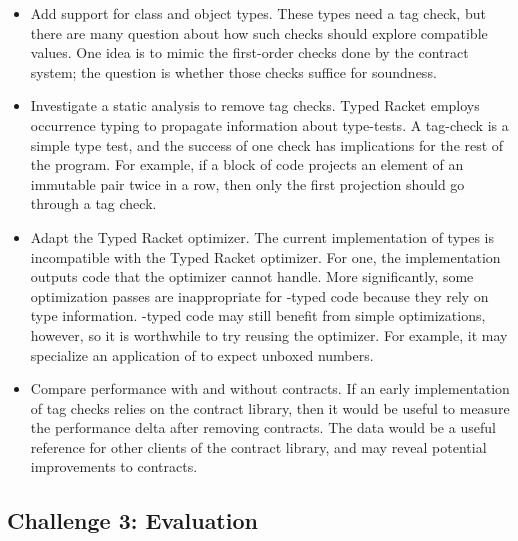 \begin{itemize}
  \item
    Add support for class and object types.
    These types need a tag check, but there are many question about how such
     checks should explore compatible values.
    One idea is to mimic the first-order checks done by the contract system;
     the question is whether those checks suffice for soundness.
  \item
    Investigate a static analysis to remove tag checks.
    Typed Racket employs occurrence typing to propagate information about type-tests.
    A tag-check is a simple type test, and the success of one check has implications
     for the rest of the program.
    For example, if a block of code projects an element of an immutable pair twice in a row,
     then only the first projection should go through a tag check.
  \item
    Adapt the Typed Racket optimizer.
    The current implementation of \tshallow{} types is incompatible with the Typed
     Racket optimizer.
    For one, the implementation outputs code that the optimizer cannot handle.
    More significantly, some optimization passes are inappropriate for \tshallow{}-typed
     code because they rely on \tdeep{} type information.
    \tShallow{}-typed code may still benefit from simple optimizations, however,
     so it is worthwhile to try reusing the optimizer.
    For example, it may specialize an application of \racketcode{+} to expect unboxed numbers.
  \item
   Compare performance with and without contracts.
   If an early implementation of \tshallow{} tag checks relies on the contract library,
   then it would be useful to measure the performance delta after removing contracts.
   The data would be a useful reference for other clients of the contract library,
   and may reveal potential improvements to contracts.
\end{itemize}


\subsection{Challenge 3: Evaluation}


